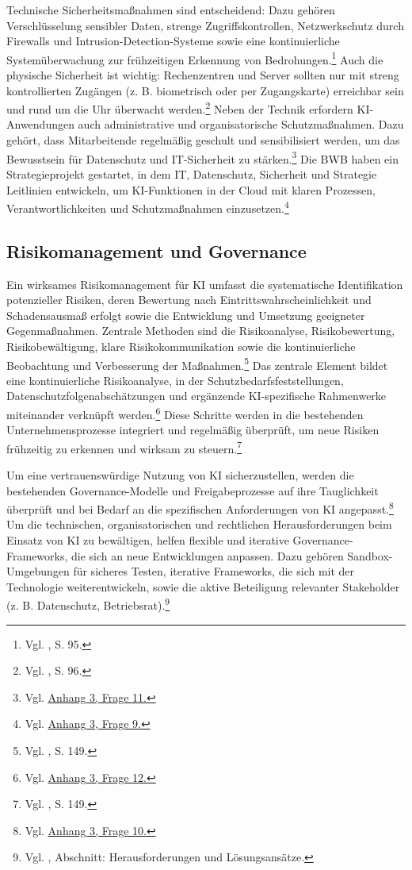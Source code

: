 \documentclass[
    12pt, 
    a4paper,
    ]{scrartcl} %
\begin{document}
Technische Sicherheitsmaßnahmen sind entscheidend: Dazu gehören Verschlüsselung sensibler Daten, strenge Zugriffskontrollen, Netzwerkschutz durch Firewalls und Intrusion-Detection-Systeme sowie eine kontinuierliche Systemüberwachung zur frühzeitigen Erkennung von Bedrohungen.\footnote{Vgl. \cite{S_Fabarius2023}, S. 95.} Auch die physische Sicherheit ist wichtig: Rechenzentren und Server sollten nur mit streng kontrollierten Zugängen (z. B. biometrisch oder per Zugangskarte) erreichbar sein und rund um die Uhr überwacht werden.\footnote{Vgl. \cite{S_Fabarius2023}, S. 96.}
Neben der Technik erfordern KI-Anwendungen auch administrative und organisatorische Schutzmaßnahmen. Dazu gehört, dass Mitarbeitende regelmäßig geschult und sensibilisiert werden, um das Bewusstsein für Datenschutz und IT-Sicherheit zu stärken.\footnote{Vgl. \hyperref[sec:Anhang3]{Anhang 3, Frage 11.}} Die BWB haben ein Strategieprojekt gestartet, in dem IT, Datenschutz, Sicherheit und Strategie Leitlinien entwickeln, um KI-Funktionen in der Cloud mit klaren Prozessen, Verantwortlichkeiten und Schutzmaßnahmen einzusetzen.\footnote{Vgl. \hyperref[sec:Anhang3]{Anhang 3, Frage 9.}}

\subsection{Risikomanagement und Governance}

Ein wirksames Risikomanagement für KI umfasst die systematische Identifikation potenzieller Risiken, deren Bewertung nach Eintrittswahrscheinlichkeit und Schadensausmaß erfolgt sowie die Entwicklung und Umsetzung geeigneter Gegenmaßnahmen. Zentrale Methoden sind die Risikoanalyse, Risikobewertung, Risikobewältigung, klare Risikokommunikation sowie die kontinuierliche Beobachtung und Verbesserung der Maßnahmen.\footnote{Vgl. \cite{S_Fabarius2023}, S. 149.} Das zentrale Element bildet eine kontinuierliche Risikoanalyse, in der Schutzbedarfsfeststellungen, Datenschutzfolgenabschätzungen und ergänzende KI-spezifische Rahmenwerke miteinander verknüpft werden.\footnote{Vgl. \hyperref[sec:Anhang3]{Anhang 3, Frage 12.}} Diese Schritte werden in die bestehenden Unternehmensprozesse integriert und regelmäßig überprüft, um neue Risiken frühzeitig zu erkennen und wirksam zu steuern.\footnote{Vgl. \cite{S_Fabarius2023}, S. 149.}

Um eine vertrauenswürdige Nutzung von KI sicherzustellen, werden die bestehenden Governance-Modelle und Freigabeprozesse auf ihre Tauglichkeit überprüft und bei Bedarf an die spezifischen Anforderungen von KI angepasst.\footnote{Vgl. \hyperref[sec:Anhang3]{Anhang 3, Frage 10.}} Um die technischen, organisatorischen und rechtlichen Herausforderungen beim Einsatz von KI zu bewältigen, helfen flexible und iterative Governance-Frameworks, die sich an neue Entwicklungen anpassen. Dazu gehören Sandbox-Umgebungen für sicheres Testen, iterative Frameworks, die sich mit der Technologie weiterentwickeln, sowie die aktive Beteiligung relevanter Stakeholder (z. B. Datenschutz, Betriebsrat).\footnote{Vgl. \cite{S_Cegos2025}, Abschnitt: Herausforderungen und Lösungsansätze.}
\end{document}
